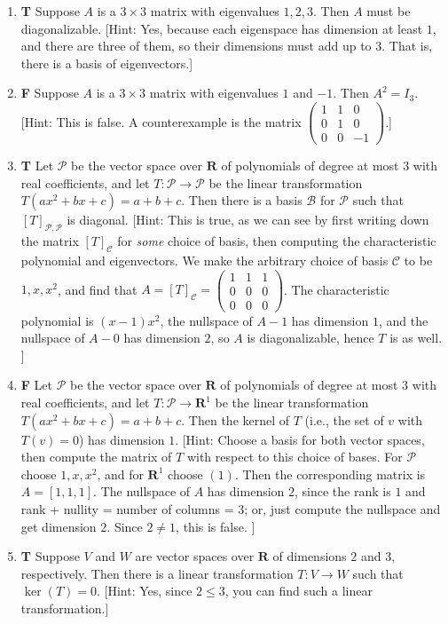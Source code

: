 \documentclass[10pt]{article}
\newcommand{\tf}[3]{\item {\bf {\color{blue}\hspace{1em}#1}}\hspace{1em} #2 [Hint: #3]}
\newcommand{\R}{\mathbf{R}}
\renewcommand{\P}{\mathcal{P}}
\begin{document}
\begin{enumerate}
\tf{T}{Suppose $A$ is a $3 \times 3$ matrix with eigenvalues $1,2,3$. Then $A$ must be diagonalizable.}{Yes, because
each eigenspace has dimension at least $1$, and there are three of them, so their dimensions must add up to $3$.  That is,
there is a basis of eigenvectors.}

\tf{F}{Suppose $A$ is a $3 \times 3$ matrix with eigenvalues $1$ and $-1$.  Then $A^2=I_3$.}{This is false. A counterexample
is the matrix $\left(\begin{array}{rrr}
1 & 1 & 0 \\
0 & 1 & 0 \\
0 & 0 & -1
\end{array}\right)$.}

\tf{T}{Let $\P$ be the vector space over $\R$ of polynomials of degree at most $3$ with real coefficients,
and let $T:\P\to\P$ be the linear transformation $T(ax^2+bx+c)=a+b+c$.  Then there is a basis $\mathcal{B}$
for $\P$ such that $[T]_{\P,\P}$ is diagonal.}{This is true, as we can see by first writing down the
matrix $[T]_{\mathcal{C}}$ for {\em some} choice of basis, then computing the characteristic polynomial
and eigenvectors.  We make the arbitrary choice of basis $\mathcal{C}$ to be $1,x,x^2$, and find that
$A=[T]_{\mathcal{C}} = \left(\begin{array}{rrr}
1 & 1 & 1 \\
0 & 0 & 0 \\
0 & 0 & 0
\end{array}\right)$.
The characteristic polynomial is $(x-1)x^2$, the nullspace of $A-1$ has dimension $1$, and the nullspace
of $A-0$ has dimension $2$, so $A$ is diagonalizable, hence $T$ is as well.
}

\tf{F}{Let $\P$ be the vector space over $\R$ of polynomials of degree at most $3$ with real coefficients,
and let $T:\P\to\R^1$ be the linear transformation $T(ax^2+bx+c)=a+b+c$.
Then the kernel of $T$ (i.e., the set of $v$ with $T(v)=0$) has dimension $1$.}
{Choose a basis for both vector spaces, then compute the matrix of $T$ with respect to this
choice of bases.  For $\P$ choose $1,x,x^2$, and for $\R^1$ choose $(1)$.  Then the
corresponding matrix is $A=[1,1,1]$.  The nullspace of $A$ has dimension $2$, since
the rank is $1$ and rank + nullity = number of columns = 3; or, just compute the nullspace
and get dimension $2$.  Since $2\neq 1$, this is false.
}

\tf{T}{Suppose $V$ and $W$ are vector spaces over $\R$ of dimensions $2$ and $3$, respectively.
Then there is a linear transformation $T:V\to W$ such that $\ker(T)=0$.}{Yes, since $2\leq 3$,
you can find such a linear transformation.}


\end{enumerate}
\end{document}
